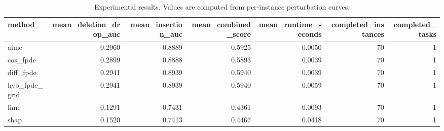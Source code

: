 \begin{table}[t]
\caption{Experimental results. Values are computed from per-instance perturbation curves.}
\label{tab:main_results_computed}
\centering
\begin{tabular}{lrrrrrr}
\toprule
method & mean\_deletion\_drop\_auc & mean\_insertion\_auc & mean\_combined\_score & mean\_runtime\_seconds & completed\_instances & completed\_tasks \\
\midrule
aime & 0.2960 & 0.8889 & 0.5925 & 0.0050 & 70 & 1 \\
cos\_fpde & 0.2899 & 0.8888 & 0.5893 & 0.0039 & 70 & 1 \\
diff\_fpde & 0.2941 & 0.8939 & 0.5940 & 0.0039 & 70 & 1 \\
hyb\_fpde\_grid & 0.2941 & 0.8939 & 0.5940 & 0.0059 & 70 & 1 \\
lime & 0.1291 & 0.7431 & 0.4361 & 0.0093 & 70 & 1 \\
shap & 0.1520 & 0.7413 & 0.4467 & 0.0418 & 70 & 1 \\
\bottomrule
\end{tabular}

\end{table}
